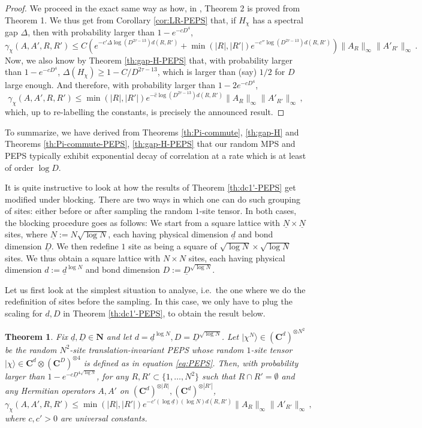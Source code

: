 \documentclass{amsart}
\newtheorem{theorem}{Theorem}[section]
\newcommand{\N}{\mathbf{N}}
\newcommand{\C}{\mathbf{C}}
\renewcommand{\leq}{\leqslant}
\renewcommand{\geq}{\geqslant}
\newcommand{\ket}[1]{| #1 \rangle}
\begin{document}
\begin{proof}
    We proceed in the exact same way as how, in \cite{Has3}, Theorem 2 is proved from Theorem 1. We thus get from Corollary \ref{cor:LR-PEPS} that, if $H_{\chi}$ has a spectral gap $\Delta$, then with probability larger than $1-e^{-cD^4}$,
    \[ \gamma_{\chi}(A,A',R,R') \leq C\left( e^{-c'\Delta\log(D^{2\tau-13})d(R,R')} + \min(|R|,|R'|)e^{-c''\log(D^{2\tau-13}) d(R,R')} \right) \|A_R\|_{\infty}\|A'_{R'}\|_{\infty} \, . \]
    Now, we also know by Theorem \ref{th:gap-H-PEPS} that, with probability larger than $1-e^{-cD^4}$, $\Delta(H_{\chi})\geq 1-C/D^{2\tau-13}$, which is larger than (say) $1/2$ for $D$ large enough. And therefore, with probability larger than $1-2e^{-cD^4}$,
    \[ \gamma_{\chi}(A,A',R,R') \leq \min(|R|,|R'|)e^{-\hat{c}\log(D^{2\tau-13}) d(R,R')} \|A_R\|_{\infty}\|A'_{R'}\|_{\infty} \, , \]
    which, up to re-labelling the constants, is precisely the announced result.
\end{proof}

To summarize, we have derived from Theorems \ref{th:Pi-commute}, \ref{th:gap-H} and Theorems \ref{th:Pi-commute-PEPS}, \ref{th:gap-H-PEPS} that our random MPS and PEPS typically exhibit exponential decay of correlation at a rate which is at least of order $\log D$.

It is quite instructive to look at how the results of Theorem \ref{th:dc1'-PEPS} get modified under blocking. There are two ways in which one can do such grouping of sites: either before or after sampling the random $1$-site tensor. In both cases, the blocking procedure goes as follows: We start from a square lattice with $\underline{N}\times\underline{N}$ sites, where $\underline{N}:=N\sqrt{\log N}$, each having physical dimension $\underline{d}$ and bond dimension $\underline{D}$. We then redefine $1$ site as being a square of $\sqrt{\log N}\times\sqrt{\log N}$ sites. We thus obtain a square lattice with $N\times N$ sites, each having physical dimension $d:=\underline{d}^{\log N}$ and bond dimension $D:=\underline{D}^{\sqrt{\log N}}$.

Let us first look at the simplest situation to analyse, i.e.~the one where we do the redefinition of sites before the sampling. In this case, we only have to plug the scaling for $d,D$ in Theorem \ref{th:dc1'-PEPS}, to obtain the result below.

\begin{theorem} \label{th:dc1'-PEPS-block1}
    Fix $\underline{d},\underline{D}\in\N$ and let $d=\underline{d}^{\log N},D=\underline{D}^{\sqrt{\log N}}$. Let $\ket{\chi^N}\in(\C^d)^{\otimes N^2}$ be the random $N^2$-site translation-invariant PEPS whose random $1$-site tensor $\ket{\chi}\in\C^d\otimes(\C^D)^{\otimes 4}$ is defined as in equation \eqref{eq:PEPS}. Then, with probability larger than $1-e^{-c\underline{D}^{4\sqrt{\log N}}}$, for any $R,R'\subset\{1,\ldots,N^2\}$ such that $R\cap R'=\emptyset$ and any Hermitian operators $A,A'$ on $(\C^d)^{\otimes |R|},(\C^d)^{\otimes |R'|}$,
    \[ \gamma_{\chi}(A,A',R,R') \leq \min(|R|,|R'|)e^{-c'(\log\underline{d})(\log N)d(R,R')} \|A_R\|_{\infty}\|A'_{R'}\|_{\infty} \, , \]
    where $c,c'>0$ are universal constants.
\end{theorem}
\end{document}
